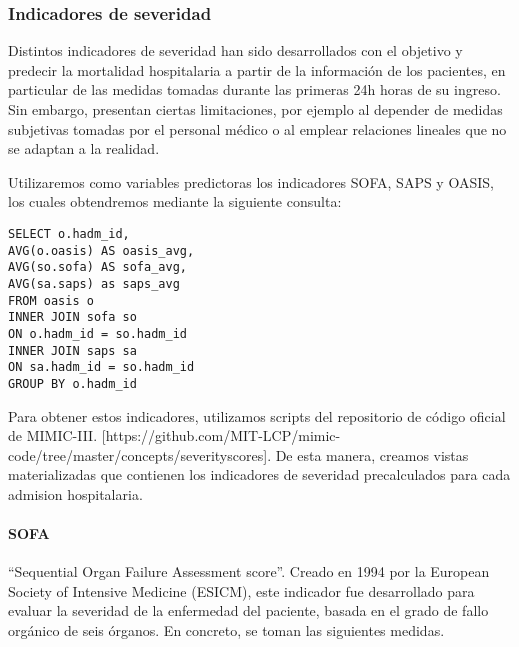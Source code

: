 \documentclass{report}
\begin{document}
\subsubsection{Indicadores de severidad}
Distintos indicadores de severidad han sido desarrollados con el
objetivo y predecir la mortalidad hospitalaria a partir de la
información de los pacientes, en particular de las medidas tomadas
durante las primeras 24h horas de su ingreso. Sin embargo, presentan
ciertas limitaciones, por ejemplo al depender de medidas subjetivas
tomadas por el personal médico o al emplear relaciones lineales que no
se adaptan a la realidad.

Utilizaremos como variables predictoras los indicadores SOFA, SAPS y
OASIS, los cuales obtendremos mediante la siguiente consulta:

\begin{verbatim}
SELECT o.hadm_id, 
AVG(o.oasis) AS oasis_avg, 
AVG(so.sofa) AS sofa_avg, 
AVG(sa.saps) as saps_avg
FROM oasis o
INNER JOIN sofa so
ON o.hadm_id = so.hadm_id
INNER JOIN saps sa
ON sa.hadm_id = so.hadm_id
GROUP BY o.hadm_id
\end{verbatim}

Para obtener estos indicadores, utilizamos scripts del repositorio de
código oficial de MIMIC-III.
{[}https://github.com/MIT-LCP/mimic-code/tree/master/concepts/severityscores{]}.
De esta manera, creamos vistas materializadas que contienen los
indicadores de severidad precalculados para cada admision hospitalaria.

\paragraph{SOFA}

``Sequential Organ Failure Assessment score''. Creado en 1994 por la
European Society of Intensive Medicine (ESICM), este indicador fue
desarrollado para evaluar la severidad de la enfermedad del paciente,
basada en el grado de fallo orgánico de seis órganos. En concreto, se
toman las siguientes medidas.
\end{document}
